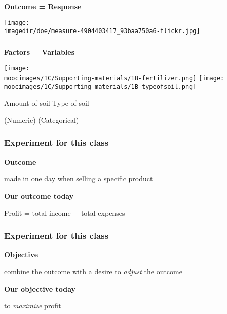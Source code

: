 \documentclass[handout,11pt,aspectratio=169,mathserif]{beamer}
\begin{document}

\begin{frame}\frametitle{}
	\LARGE \textbf{{\color{purple} Outcome = Response}}
	
	
	
	\begin{flushright}
		\texttt{[image: \\imagedir/doe/measure-4904403417\_93baa750a6-flickr.jpg]}
		
	\end{flushright}
\end{frame}

\begin{frame}\frametitle{}
	\LARGE \textbf{{\color{purple} Factors = Variables}}
	
	
	
	\begin{flushright}
		\texttt{[image: \\moocimages/1C/Supporting-materials/1B-fertilizer.png]}
		\texttt{[image: \\moocimages/1C/Supporting-materials/1B-typeofsoil.png]}

		Amount of soil	\hfill Type of soil 
		
		(Numeric)	\hfill (Categorical)
	\end{flushright}
\end{frame}

\begin{frame}\frametitle{Experiment for this class}
	
	{\LARGE\textbf{{\color{purple} Outcome}}}
	
		 made in one day when selling a specific product
		
	\vspace{24pt}
	\pause
	
	{\LARGE\textbf{{\color{purple} Our outcome today}}}
	
		\qquad 	Profit = total income $-$ total expenses


	
\end{frame}

\begin{frame}\frametitle{Experiment for this class}
	
	{\LARGE\textbf{{\color{purple} Objective}}}
	
	
		\qquad combine the {\color{purple} outcome} with a desire to \emph{adjust} the outcome
		
	\vspace{24pt}
	\pause
	
	{\LARGE\textbf{{\color{purple} Our objective today}}}
	
		\qquad 	to \emph{maximize} profit
\end{frame}
\end{document}
